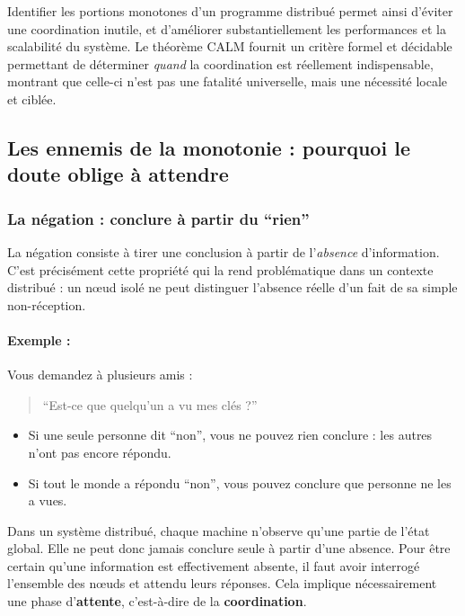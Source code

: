 \documentclass[12pt,a4paper]{article}
\begin{document}
Identifier les portions monotones d'un programme distribué permet ainsi d'éviter une
coordination inutile, et d'améliorer substantiellement les performances et la scalabilité
du système. Le théorème CALM fournit un critère formel et décidable permettant de
déterminer \textit{quand} la coordination est réellement indispensable, montrant que
celle-ci n'est pas une fatalité universelle, mais une nécessité locale et ciblée.

\subsection{Les ennemis de la monotonie : pourquoi le doute oblige à attendre}


\subsubsection{La négation : conclure à partir du ``rien''}

La négation consiste à tirer une conclusion à partir de l'\textit{absence} d'information.
C'est précisément cette propriété qui la rend problématique dans un contexte distribué :
un nœud isolé ne peut distinguer l'absence réelle d'un fait de sa simple non-réception.

\paragraph{Exemple :}

Vous demandez à plusieurs amis :
\begin{quote}
``Est-ce que quelqu'un a vu mes clés ?''
\end{quote}

\begin{itemize}
    \item Si une seule personne dit ``non'', vous ne pouvez rien conclure : les autres
    n'ont pas encore répondu.
    \item Si tout le monde a répondu ``non'', vous pouvez conclure que personne ne
    les a vues.
\end{itemize}

Dans un système distribué, chaque machine n'observe qu'une partie de l'état global.
Elle ne peut donc jamais conclure seule à partir d'une absence. Pour être certain
qu'une information est effectivement absente, il faut avoir interrogé l'ensemble
des nœuds et attendu leurs réponses. Cela implique nécessairement une phase
d'\textbf{attente}, c'est-à-dire de la \textbf{coordination}.
\end{document}
